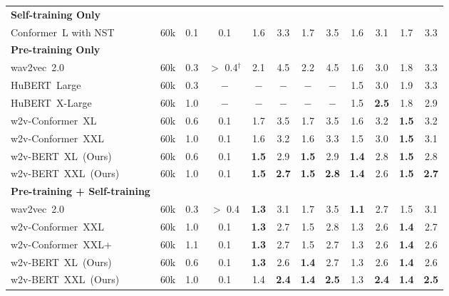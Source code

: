 \documentclass{article}
\begin{document}
\begin{table*}[htbp]
{\begin{tabular}{lccccccccccc}
\midrule
    \bfseries Self-training Only \\
    \quad  Conformer~L with NST~\cite{zhang2020pushing}
    & 60k & 0.1 & 0.1
    & 1.6 & 3.3 & 1.7 & 3.5
    & 1.6 & 3.1 & 1.7 & 3.3 \\
    \midrule
    \bfseries Pre-training Only \\
    \quad wav2vec~2.0~\cite{xu2021self}
    & 60k & 0.3 & $>$ 0.4$^{\dagger}$
    & 2.1 & 4.5 & 2.2 & 4.5
    & 1.6 & 3.0 & 1.8 & 3.3 \\ 
    \quad HuBERT~Large~\cite{hsu2021hubert}
    & 60k & 0.3 & $-$
    & $-$ & $-$ & $-$ & $-$
    & 1.5 & 3.0 & 1.9 & 3.3 \\
    \quad HuBERT~X-Large~\cite{hsu2021hubert}
    & 60k & 1.0 & $-$
    &  $-$ & $-$ & $-$ & $-$
    &  1.5 & \textbf{2.5} & 1.8 & 2.9 \\
    \quad w2v-Conformer~XL~\cite{zhang2020pushing}
    & 60k & 0.6 & 0.1
    & 1.7 & 3.5 & 1.7 & 3.5
    & 1.6 & 3.2 & \bfseries 1.5 & 3.2 \\
    \quad w2v-Conformer~XXL~\cite{zhang2020pushing}
    & 60k & 1.0 & 0.1
    & 1.6 & 3.2 & 1.6 & 3.3 
    & 1.5 & 3.0 & \bfseries 1.5 & 3.1 \\
    \quad w2v-BERT~XL~(Ours)
    & 60k & 0.6 & 0.1
    & \textbf{1.5} & 2.9 & \bfseries 1.5 & 2.9
    & \bfseries 1.4 & 2.8 & \bfseries 1.5 & 2.8 \\
    \quad w2v-BERT~XXL~(Ours) 
    & 60k & 1.0 & 0.1
    & \textbf{1.5} & \textbf{2.7} & \textbf{1.5} & \textbf{2.8}
    & \textbf{1.4} & {2.6} & \textbf{1.5} & \textbf{2.7} \\
    \midrule
    \bfseries Pre-training + Self-training \\
    \quad  wav2vec~2.0~\cite{xu2021self}
    & 60k & 0.3 & $>$ 0.4
    & \bfseries 1.3 & 3.1 &  1.7 & 3.5
    & \bfseries 1.1 & 2.7 & 1.5 & 3.1 \\
    \quad  w2v-Conformer~XXL~\cite{zhang2020pushing}
    & 60k & 1.0 & 0.1
    &  \bfseries 1.3 & 2.7 & 1.5 & 2.8
    &  1.3 & 2.6 & \bfseries 1.4 & 2.7 \\
    \quad  w2v-Conformer~XXL+~\cite{zhang2020pushing}
    & 60k & 1.1 & 0.1
    &  \bfseries 1.3 & 2.7  & 1.5  & 2.7 
    &  1.3 &  2.6 & \bfseries 1.4 &  2.6 \\
    \quad  w2v-BERT~XL~(Ours)
    & 60k & 0.6 & 0.1
    &  \bfseries 1.3 & 2.6 & \bfseries 1.4 & 2.7
    &  1.3 & 2.6 & \bfseries 1.4 & 2.6 \\
    \quad  w2v-BERT~XXL~(Ours)
    & 60k & 1.0 & 0.1
    &  1.4 & \bfseries 2.4  & \bfseries 1.4  & \bfseries 2.5 
    &  1.3 & \bfseries 2.4 & \bfseries 1.4 & \bfseries 2.5 \\
    \bottomrule
  \end{tabular}
  }
\end{table*}
\end{document}
